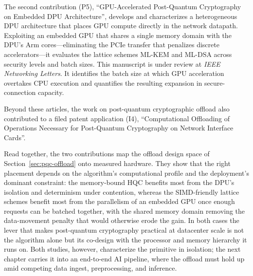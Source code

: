 The second contribution (P5), \enquote{GPU-Accelerated Post-Quantum Cryptography on Embedded DPU Architecture}, develops and characterizes a heterogeneous DPU architecture that places GPU compute directly in the network datapath. Exploiting an embedded GPU that shares a single memory domain with the DPU's Arm cores---eliminating the PCIe transfer that penalizes discrete accelerators---it evaluates the lattice schemes ML-KEM and ML-DSA across security levels and batch sizes. This manuscript is under review at \emph{IEEE Networking Letters}. It identifies the batch size at which GPU acceleration overtakes CPU execution and quantifies the resulting expansion in secure-connection capacity.

Beyond these articles, the work on post-quantum cryptographic offload also contributed to a filed patent application (I4), \enquote{Computational Offloading of Operations Necessary for Post-Quantum Cryptography on Network Interface Cards}.

Read together, the two contributions map the offload design space of Section~\ref{sec:pqc-offload} onto measured hardware. They show that the right placement depends on the algorithm's computational profile and the deployment's dominant constraint: the memory-bound HQC benefits most from the DPU's isolation and determinism under contention, whereas the SIMD-friendly lattice schemes benefit most from the parallelism of an embedded GPU once enough requests can be batched together, with the shared memory domain removing the data-movement penalty that would otherwise erode the gain. In both cases the lever that makes post-quantum cryptography practical at datacenter scale is not the algorithm alone but its co-design with the processor and memory hierarchy it runs on. Both studies, however, characterize the primitive in isolation; the next chapter carries it into an end-to-end AI pipeline, where the offload must hold up amid competing data ingest, preprocessing, and inference.


